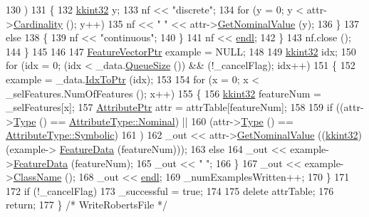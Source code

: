 \begin{DoxyCode}
130           )
131       \{
132         \hyperlink{namespace_k_k_b_a8fa4952cc84fda1de4bec1fbdd8d5b1b}{kkint32} y;
133         nf << \textcolor{stringliteral}{"discrete"}; 
134         \textcolor{keywordflow}{for}  (y = 0;  y < attr->\hyperlink{class_k_k_m_l_l_1_1_attribute_a7a7e8d04e3a93b47f6c2d1f99f0e42c6}{Cardinality} ();  y++)
135           nf << \textcolor{stringliteral}{" "} << attr->\hyperlink{class_k_k_m_l_l_1_1_attribute_ad9342fb254fb972f63825f8d5be25311}{GetNominalValue} (y);
136       \}
137       \textcolor{keywordflow}{else}
138       \{
139         nf << \textcolor{stringliteral}{"continuous"};
140       \}
141       nf << \hyperlink{namespace_k_k_b_ad1f50f65af6adc8fa9e6f62d007818a8}{endl};
142     \}
143     nf.close ();
144   \}
145 
146 
147   \hyperlink{class_k_k_m_l_l_1_1_feature_vector}{FeatureVectorPtr}   example = NULL;
148 
149   \hyperlink{namespace_k_k_b_a8fa4952cc84fda1de4bec1fbdd8d5b1b}{kkint32} idx;
150   \textcolor{keywordflow}{for}  (idx = 0;  (idx < \_data.\hyperlink{class_k_k_b_1_1_k_k_queue_a1dab601f75ee6a65d97f02bddf71c40d}{QueueSize} ()) && (!\_cancelFlag);  idx++)
151   \{
152     example = \_data.\hyperlink{class_k_k_b_1_1_k_k_queue_acce2bdd8b3327e38266cf198382cd852}{IdxToPtr} (idx);
153 
154     \textcolor{keywordflow}{for}  (x = 0; x < \_selFeatures.NumOfFeatures (); x++)
155     \{
156       \hyperlink{namespace_k_k_b_a8fa4952cc84fda1de4bec1fbdd8d5b1b}{kkint32}  featureNum = \_selFeatures[x];
157       \hyperlink{class_k_k_m_l_l_1_1_attribute}{AttributePtr} attr = attrTable[featureNum];
158 
159       \textcolor{keywordflow}{if}  ((attr->\hyperlink{class_k_k_m_l_l_1_1_attribute_ae867c1b4e264fb7be26941730364116d}{Type} () == \hyperlink{namespace_k_k_m_l_l_a99973706982b59debba670e2480555aba8c28d7c312116b8a46e2f466cb33d5b4}{AttributeType::Nominal})  ||
160            (attr->\hyperlink{class_k_k_m_l_l_1_1_attribute_ae867c1b4e264fb7be26941730364116d}{Type} () == \hyperlink{namespace_k_k_m_l_l_a99973706982b59debba670e2480555abaaddee1396a3e20ceea8071ed6da54866}{AttributeType::Symbolic})
161           )
162         \_out << attr->\hyperlink{class_k_k_m_l_l_1_1_attribute_ad9342fb254fb972f63825f8d5be25311}{GetNominalValue} ((\hyperlink{namespace_k_k_b_a8fa4952cc84fda1de4bec1fbdd8d5b1b}{kkint32})(example->
      \hyperlink{class_k_k_m_l_l_1_1_feature_vector_af055b7c725a4d80a31cd2f6606cc37b6}{FeatureData} (featureNum)));
163       \textcolor{keywordflow}{else}
164         \_out << example->\hyperlink{class_k_k_m_l_l_1_1_feature_vector_af055b7c725a4d80a31cd2f6606cc37b6}{FeatureData} (featureNum);
165       \_out << \textcolor{stringliteral}{" "};
166     \}
167     \_out << example->\hyperlink{class_k_k_m_l_l_1_1_feature_vector_a7c410c4ab70f5f2fdc8fca66ea8000ba}{ClassName} ();
168     \_out << \hyperlink{namespace_k_k_b_ad1f50f65af6adc8fa9e6f62d007818a8}{endl};
169     \_numExamplesWritten++;
170   \}
171 
172   \textcolor{keywordflow}{if}  (!\_cancelFlag)
173     \_successful = \textcolor{keyword}{true};
174 
175   \textcolor{keyword}{delete}  attrTable;
176   \textcolor{keywordflow}{return};
177 \} \textcolor{comment}{/* WriteRobertsFile */}
\end{DoxyCode}


